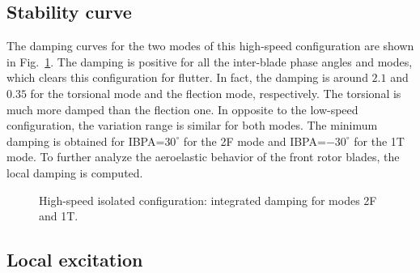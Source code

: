 
\subsection{Stability curve}
\label{sub:dream_hs_ael_curve}

The damping curves for the two modes of this high-speed
configuration are shown in Fig.~\ref{fig:dream_hs_ael_damping}.
The damping is positive for all the inter-blade phase angles
and modes, which clears this configuration for flutter.
In fact, the damping is around $2.1$ and $0.35$
for the torsional mode and the flection mode, respectively.
The torsional is much more damped than the flection one.
In opposite to the low-speed configuration, the 
variation range is similar for both modes. 
The minimum damping is obtained for IBPA=$30^\circ$
for the 2F mode and IBPA=$-30^\circ$ for the 1T mode.
To further analyze the aeroelastic behavior of the front rotor 
blades, the local damping is computed.
\begin{figure}[htp]
  \centering
  \caption{High-speed isolated configuration: integrated damping for modes 2F and 1T.}
  \label{fig:dream_hs_ael_damping}
\end{figure}

\subsection{Local excitation}
\label{sub:dream_hs_ael_local_damping}

